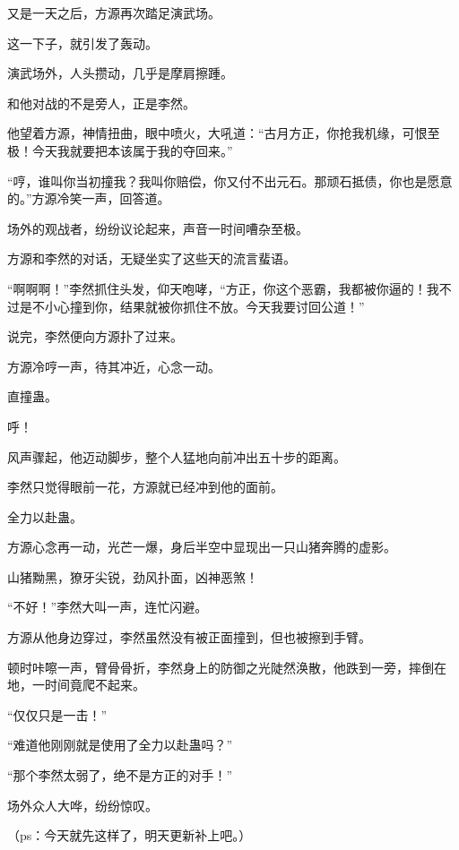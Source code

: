 \begin{this_body}
又是一天之后，方源再次踏足演武场。

这一下子，就引发了轰动。

演武场外，人头攒动，几乎是摩肩擦踵。

和他对战的不是旁人，正是李然。

他望着方源，神情扭曲，眼中喷火，大吼道：“古月方正，你抢我机缘，可恨至极！今天我就要把本该属于我的夺回来。”

“哼，谁叫你当初撞我？我叫你赔偿，你又付不出元石。那顽石抵债，你也是愿意的。”方源冷笑一声，回答道。

场外的观战者，纷纷议论起来，声音一时间嘈杂至极。

方源和李然的对话，无疑坐实了这些天的流言蜚语。

“啊啊啊！”李然抓住头发，仰天咆哮，“方正，你这个恶霸，我都被你逼的！我不过是不小心撞到你，结果就被你抓住不放。今天我要讨回公道！”

说完，李然便向方源扑了过来。

方源冷哼一声，待其冲近，心念一动。

直撞蛊。

呼！

风声骤起，他迈动脚步，整个人猛地向前冲出五十步的距离。

李然只觉得眼前一花，方源就已经冲到他的面前。

全力以赴蛊。

方源心念再一动，光芒一爆，身后半空中显现出一只山猪奔腾的虚影。

山猪黝黑，獠牙尖锐，劲风扑面，凶神恶煞！

“不好！”李然大叫一声，连忙闪避。

方源从他身边穿过，李然虽然没有被正面撞到，但也被擦到手臂。

顿时咔嚓一声，臂骨骨折，李然身上的防御之光陡然涣散，他跌到一旁，摔倒在地，一时间竟爬不起来。

“仅仅只是一击！”

“难道他刚刚就是使用了全力以赴蛊吗？”

“那个李然太弱了，绝不是方正的对手！”

场外众人大哗，纷纷惊叹。

（ps：今天就先这样了，明天更新补上吧。）

\end{this_body}

